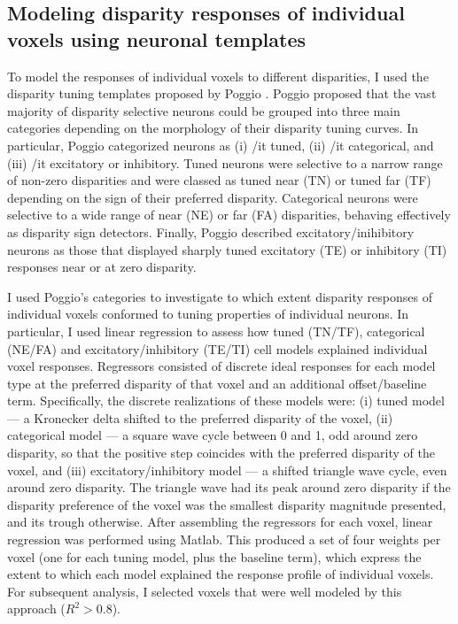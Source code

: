 \subsection{Modeling disparity responses of individual voxels using neuronal templates}
To model the responses of individual voxels to different disparities, I used the disparity tuning templates proposed by Poggio \cite{Poggio:1988ij,Poggio:1977ys}. Poggio proposed that the vast majority of disparity selective neurons could be grouped into three main categories depending on the morphology of their disparity tuning curves. In particular, Poggio categorized neurons as (i) {/it tuned}, (ii) {/it categorical}, and (iii) {/it excitatory or inhibitory}. Tuned neurons were selective to a narrow range of non-zero disparities and were classed as tuned near (TN) or tuned far (TF) depending on the sign of their preferred disparity. Categorical neurons were selective to a wide range of near (NE) or far (FA) disparities, behaving effectively as disparity sign detectors. Finally, Poggio described excitatory/inihibitory neurons as those that displayed sharply tuned excitatory (TE) or inhibitory (TI) responses near or at zero disparity.

I used Poggio's categories to investigate to which extent disparity responses of individual voxels conformed to tuning properties of individual neurons. In particular, I used linear regression to assess how tuned (TN/TF), categorical (NE/FA) and excitatory/inhibitory (TE/TI) cell models explained individual voxel responses. Regressors consisted of discrete ideal responses for each model type at the preferred disparity of that voxel and an additional offset/baseline term. Specifically, the discrete realizations of these models were: (i) tuned model --- a Kronecker delta shifted to the preferred disparity of the voxel, (ii) categorical model --- a square wave cycle between 0 and 1, odd around zero disparity, so that the positive step coincides with the preferred disparity of the voxel, and (iii) excitatory/inhibitory model --- a shifted triangle wave cycle, even around zero disparity. The triangle wave had its peak around zero disparity if the disparity preference of the voxel was the smallest disparity magnitude presented, and its trough otherwise. After assembling the regressors for each voxel, linear regression was performed using Matlab. This produced a set of four weights per voxel (one for each tuning model, plus the baseline term), which express the extent to which each model explained the response profile of individual voxels. For subsequent analysis, I selected voxels that were well modeled by this approach ($R^2 > 0.8$). 

